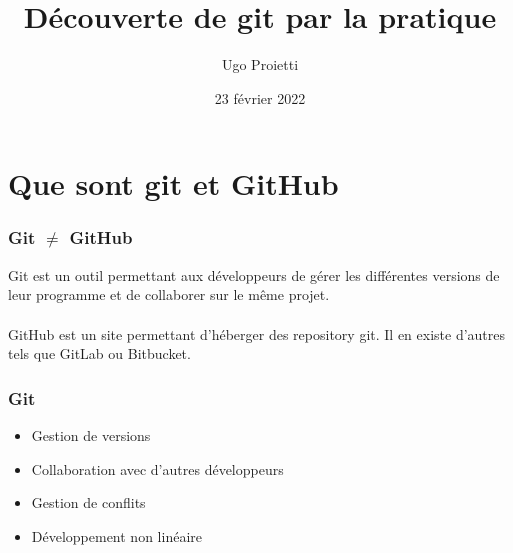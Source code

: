 \documentclass{beamer}
\title[Github]{Découverte de git par la pratique} %
\author{Ugo Proietti} %
\institute[UMONS] %
{
Université de Mons \\ %
\medskip
\textit{ugo.proietti@student.umons.ac.be} %
}
\date{23 février 2022} %
\begin{document}
\begin{frame}
\titlepage %
\end{frame}

\begin{frame}
\frametitle{} %
\tableofcontents %
\end{frame}


\section{Que sont git et GitHub} %

\begin{frame}\frametitle{Git $\neq$ GitHub}
Git est un outil permettant aux développeurs de gérer les différentes versions de leur programme et de collaborer sur le même projet.\\~\\

GitHub est un site permettant d'héberger des repository git. Il en existe d'autres tels que GitLab ou Bitbucket.
\end{frame}


\begin{frame}\frametitle{Git}
\begin{itemize}
    \item Gestion de versions
    \item Collaboration avec d'autres développeurs
    \item Gestion de conflits
    \item Développement non linéaire
\end{itemize}
\end{frame}
\end{document}
